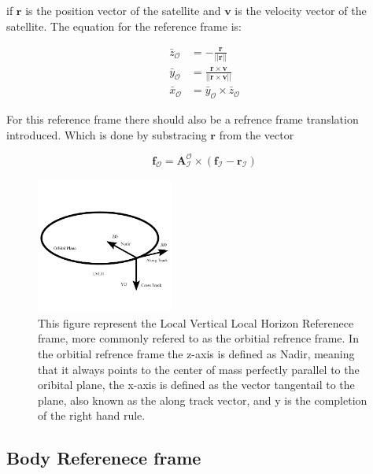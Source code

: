 if $\mathbf{r}$ is the position vector of the satellite and $\mathbf{v}$ is the velocity vector of the satellite.
The equation for the reference frame is:

\begin{align}
    \bar{z}_{\mathcal{O}} &= -\frac{\mathbf{r}}{||\mathbf{r}||} \\
    \bar{y}_{\mathcal{O}} &= \frac{\mathbf{r}\times\mathbf{v}}{||\mathbf{r}\times\mathbf{v}||}\\
    \bar{x}_{\mathcal{O}} &= \bar{y}_{\mathcal{O}}\times\bar{z}_{\mathcal{O}}
\end{align}

For this reference frame there should also be a refrence frame translation introduced. Which is done by substracing $\mathbf{r}$ from the vector

\begin{equation}
    \mathbf{f}_{\mathcal{O}} = \mathbf{A}_{\mathcal{I}}^{\mathcal{O}}\times(\mathbf{f}_{\mathcal{I}} - \mathbf{r}_{\mathcal{I}})
\end{equation}

\begin{figure}[H]
    \centering
    \includegraphics[width=0.4\textwidth]{figures/modelling/LVLH.pdf}
    \caption{This figure represent the Local Vertical Local Horizon Referenece frame, more commonly refered to as the orbitial refrence frame. In the orbitial refrence frame
    the z-axis is defined as Nadir, meaning that it always points to the center of mass perfectly parallel to the oribital plane, the x-axis is defined as the vector tangentail
    to the plane, also known as the along track vector, and y is the completion of the right hand rule.}
    \label{fig:LVHLRF}
\end{figure}

\subsection{Body Referenece frame}

